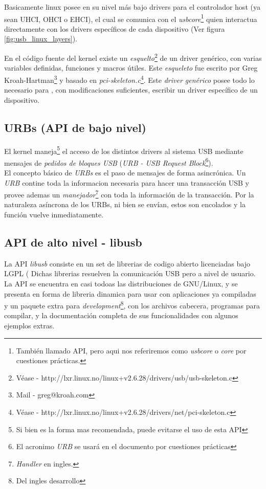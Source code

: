 Basicamente linux posee en su nivel m\'as bajo drivers para el controlador
host (ya sean UHCI, OHCI o EHCI), el cual se comunica con el
\emph{usbcore}\footnote{Tambi\'en llamado API, pero aqui nos referiremos como
\emph{usbcore} o \emph{core} por cuestiones pr\'acticas.} quien interactua
directamente con los drivers espec\'ificos de cada dispositivo (Ver figura
\ref{fig:usb_linux_layers}).


En el c\'odigo fuente del kernel existe un \emph{esquelto}\footnote{V\'ease
- http://lxr.linux.no/linux+v2.6.28/drivers/usb/usb-skeleton.c} de un driver
gen\'erico, con varias variables definidas, funciones y macros \'utiles.
Este \emph{esqueleto} fue escrito por Greg Kroah-Hartman\footnote{Mail - 
greg@kroah.com} y basado en \emph{pci-skeleton.c}\footnote{V\'ease -
http://lxr.linux.no/linux+v2.6.28/drivers/net/pci-skeleton.c}.
Este \emph{driver gen\'erico} posee todo lo necesario para , con
modificaciones suficientes, escribir un driver espec\'ifico de un dispositivo.

\subsection{URBs (API de bajo nivel)}

El kernel maneja\footnote{Si bien es la forma mas recomendada, puede evitarse
el uso de esta API} el acceso de los distintos drivers al sistema USB mediante
mensajes de \emph{pedidos de bloques USB} (\emph{URB - USB Request
Block}\footnote{El acronimo \emph{URB} se usar\'a en el documento por
cuestiones pr\'acticas}).\\

El concepto b\'asico de \emph{URBs} es el paso de mensajes de forma
asincr\'onica. 
Un \emph{URB} contine toda la informacion necesaria para hacer una
transacci\'on USB y provee ademas un \emph{manejador}\footnote{\emph{Handler}
en ingles.} con toda la informaci\'on de la transacci\'on.
Por la naturaleza as\'incrona de los URBs, ni bien se env\'ian, estos son
encolados y la funci\'on vuelve inmediatamente. 



\subsection{API de alto nivel - libusb}

La API \emph{libusb} consiste en un set de librerias de codigo abierto
licenciadas bajo LGPL (%
Dichas librerias resuelven la comunicaci\'on
USB pero a nivel de usuario.
La API se encuentra en casi todoas las distribuciones de GNU/Linux, y se
presenta en forma de libreria dinamica para usar con aplicaciones ya
compiladas y un paquete extra para \emph{development}\footnote{Del ingles
desarrollo}, con los archivos cabecera, programas para compilar, y
la documentaci\'on completa de sus funcionalidades con algunos ejemplos
extras. \\

